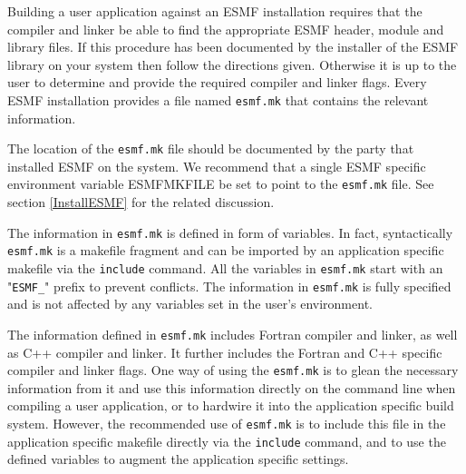
\label{UsingLibrary}

Building a user application against an ESMF installation requires that the compiler and linker be able to find the appropriate ESMF header, module and library files. If this procedure has been documented by the installer of the ESMF library on your system then follow the directions given. Otherwise it is up to the user to determine and provide the required compiler and linker flags. Every ESMF installation provides a file named {\tt esmf.mk} that contains the relevant information.

The location of the {\tt esmf.mk} file should be documented by the party that installed ESMF on the system. We recommend that a single ESMF specific environment variable ESMFMKFILE be set to point to the {\tt esmf.mk} file. See section \ref{InstallESMF} for the related discussion.

The information in {\tt esmf.mk} is defined in form of variables. In fact, syntactically {\tt esmf.mk} is a makefile fragment and can be imported by an application specific makefile via the {\tt include} command. All the variables in {\tt esmf.mk} start with an "{\tt ESMF\_}" prefix to prevent conflicts. The information in {\tt esmf.mk} is fully specified and is not affected by any variables set in the user's environment.

The information defined in {\tt esmf.mk} includes Fortran compiler and linker, as well as C++ compiler and linker. It further includes the Fortran and C++ specific compiler and linker flags. One way of using the {\tt esmf.mk} is to glean the necessary information from it and use this information directly on the command line when compiling a user application, or to hardwire it into the application specific build system. However, the recommended use of {\tt esmf.mk} is to include this file in the application specific makefile directly via the {\tt include} command, and to use the defined variables to augment the application specific settings.

